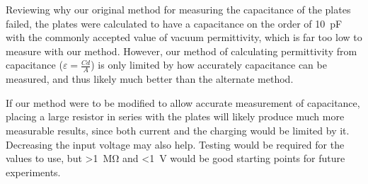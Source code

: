 \documentclass[a4paper]{scrartcl}
\begin{document}
Reviewing why our original method for measuring the capacitance of the plates failed, the plates were calculated to have a capacitance on the order of \SI{10}{\pico\farad} with the commonly accepted value of vacuum permittivity, which is far too low to measure with our method. However, our method of calculating permittivity from capacitance (\(\varepsilon = \frac{C d}{A}\)) is only limited by how accurately capacitance can be measured, and thus likely much better than the alternate method.

If our method were to be modified to allow accurate measurement of capacitance, placing a large resistor in series with the plates will likely produce much more measurable results, since both current and the charging would be limited by it. Decreasing the input voltage may also help. Testing would be required for the values to use, but \SI{>1}{\mega\ohm} and \SI{<1}{\volt} would be good starting points for future experiments.
\end{document}
